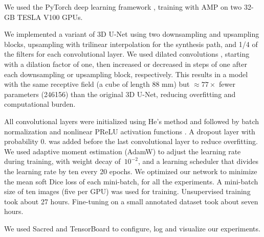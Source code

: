 We used the PyTorch deep learning framework \cite{paszke_pytorch_2019}, training with \ac{AMP} on two 32-GB TESLA V100 GPUs.

We implemented a variant of 3D U-Net \cite{cicek_3d_2016} using two downsampling and upsampling blocks, upsampling with trilinear interpolation for the synthesis path, and 1/4 of the filters for each convolutional layer.
We used dilated convolutions \cite{chen_deeplab_2017}, starting with a dilation factor of one, then increased or decreased in steps of one after each downsampling or upsampling block, respectively.
This results in a model with the same receptive field (a cube of length 88 mm) but $\approx 77 \times$ fewer parameters (\num{246156}) than the original 3D U-Net, reducing overfitting and computational burden.

All convolutional layers were initialized using He's method and followed by batch normalization and nonlinear PReLU activation functions \cite{ioffe_batch_2015,he_delving_2015}.
A dropout layer with probability 0. \cite{srivastava_dropout_2014} was added before the last convolutional layer to reduce overfitting.
We used adaptive moment estimation (AdamW) \cite{kingma_adam_2014,loshchilov_decoupled_2019} to adjust the learning rate during training, with
weight decay of~$10^{-2}$,
and a learning scheduler that divides the learning rate by ten every 20 epochs.
We optimized our network to minimize the mean soft Dice loss \cite{milletari_v-net_2016} of each mini-batch, for all the experiments.
A mini-batch size of ten images (five per GPU) was used for training.
Unsupervised training took about 27 hours.
Fine-tuning on a small annotated dataset took about seven hours.

We used Sacred \cite{greff_sacred_2017} and TensorBoard \cite{abadi_tensorflow_2016} to configure, log and visualize our experiments.